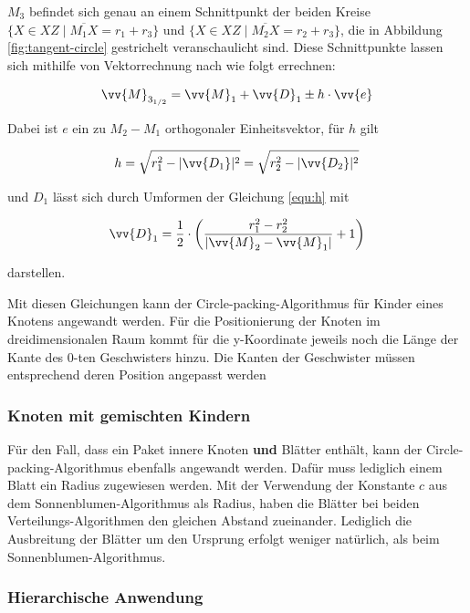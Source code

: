$M_3$ befindet sich genau an einem Schnittpunkt der beiden Kreise $\lbrace X \in XZ \mid \overline{M_1 X} = r_1 + r_3 \rbrace$ und $\lbrace X \in XZ \mid \overline{M_2 X} = r_2 + r_3 \rbrace$, die in Abbildung \ref{fig:tangent-circle} gestrichelt veranschaulicht sind. Diese Schnittpunkte lassen sich mithilfe von Vektorrechnung nach \cite{wikipedia2017schnitt} wie folgt errechnen:

\begin{equation}
  \vv{M}_{3_{1/2}} = \vv{M}_1 + \vv{D}_{1} \pm h \cdot \vv{e}
\end{equation}

Dabei ist $e$ ein zu $M_2 - M_1$ orthogonaler Einheitsvektor, für $h$ gilt

\begin{equation}
\label{equ:h}
  h = \sqrt{r_1^2 - \vert \vv{D_1} \vert^2} = \sqrt{r_2^2 - \vert \vv{D_2} \vert^2}
\end{equation}

und $D_1$ lässt sich durch Umformen der Gleichung \ref{equ:h} mit

\begin{equation}
  \vv{D}_1 = \frac{1}{2} \cdot \left( \frac{r_1^2 - r_2^2}{\vert \vv{M}_2 - \vv{M}_1 \vert} + 1 \right)
\end{equation}

darstellen.

Mit diesen Gleichungen kann der Circle-packing-Algorithmus für Kinder eines Knotens angewandt werden. Für die Positionierung der Knoten im dreidimensionalen Raum kommt für die y-Koordinate jeweils noch die Länge der Kante des $0$-ten Geschwisters hinzu. Die Kanten der Geschwister müssen entsprechend deren Position angepasst werden

\subsubsection*{Knoten mit gemischten Kindern}

Für den Fall, dass ein Paket innere Knoten \textbf{und} Blätter enthält, kann der Circle-packing-Algorithmus ebenfalls angewandt werden. Dafür muss lediglich einem Blatt ein Radius zugewiesen werden. Mit der Verwendung der Konstante $c$ aus dem Sonnenblumen-Algorithmus als Radius, haben die Blätter bei beiden Verteilungs-Algorithmen den gleichen Abstand zueinander. Lediglich die Ausbreitung der Blätter um den Ursprung erfolgt weniger natürlich, als beim Sonnenblumen-Algorithmus.

\subsubsection*{Hierarchische Anwendung}

